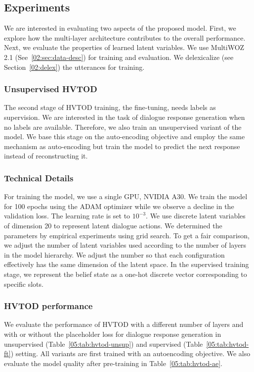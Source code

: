 \subsection{Experiments}
We are interested in evaluating two aspects of the proposed model.
First, we explore how the multi-layer architecture contributes to the overall performance.
Next, we evaluate the properties of learned latent variables.
We use MultiWOZ 2.1 (See~\ref{02:sec:data-desc}) for training and evaluation.
We delexicalize (see Section~\ref{02:delex}) the utterances for training.

\subsubsection{Unsupervised HVTOD}
The second stage of HVTOD training, the fine-tuning, needs labels as supervision.
We are interested in the task of dialogue response generation when no labels are available.
Therefore, we also train an unsupervised variant of the model.
We base this stage on the auto-encoding objective and employ the same mechanism as auto-encoding but train the model to predict the next response instead of reconstructing it.

\subsubsection{Technical Details}
For training the model, we use a single GPU, NVIDIA A30.
We train the model for 100 epochs using the ADAM optimizer while we observe a decline in the validation loss.
The learning rate is set to $10^{-3}$.
We use discrete latent variables of dimension 20 to represent latent dialogue actions.
We determined the parameters by empirical experiments using grid search.
To get a fair comparison, we adjust the number of latent variables used according to the number of layers in the model hierarchy.
We adjust the number so that each configuration effectively has the same dimension of the latent space.
In the supervised training stage, we represent the belief state as a one-hot discrete vector corresponding to specific slots.

\subsubsection{HVTOD performance}
We evaluate the performance of HVTOD with a different number of layers and with or without the placeholder loss for dialogue response generation in unsupervised (Table~\ref{05:tab:hvtod-unsup}) and supervised (Table~\ref{05:tab:hvtod-ft}) setting.
All variants are first trained with an autoencoding objective.
We also evaluate the model quality after pre-training in Table~\ref{05:tab:hvtod-ae}.

